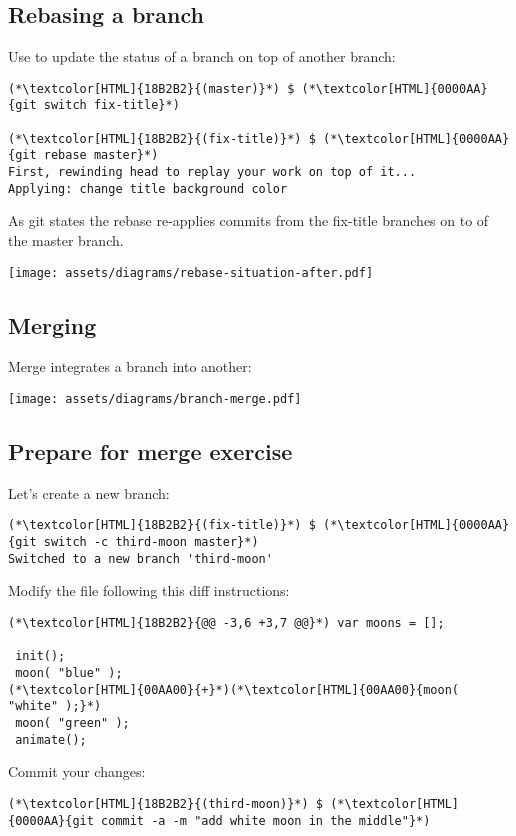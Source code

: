 \subsection{Rebasing a branch}
\begin{frame}[fragile]
  \subslidetitle

  Use  to update the status of a branch on top of another branch:

  \begin{lstlisting}
(*\textcolor[HTML]{18B2B2}{(master)}*) $ (*\textcolor[HTML]{0000AA}{git switch fix-title}*)

(*\textcolor[HTML]{18B2B2}{(fix-title)}*) $ (*\textcolor[HTML]{0000AA}{git rebase master}*)
First, rewinding head to replay your work on top of it...
Applying: change title background color
\end{lstlisting}

  As git states the rebase re-applies commits from the fix-title branches on to of the master branch.

  \vspace{1em}
  \centerline{\texttt{[image: assets/diagrams/rebase-situation-after.pdf]}}

\end{frame}

\subsection{Merging}
\begin{frame}[fragile]
  \subslidetitle
  Merge integrates a branch into another:
  \centerline{\texttt{[image: assets/diagrams/branch-merge.pdf]}}
\end{frame}

\subsection{Prepare for merge exercise}
\begin{frame}[fragile]
  \subslidetitle

  Let's create a new  branch:
  \begin{lstlisting}
(*\textcolor[HTML]{18B2B2}{(fix-title)}*) $ (*\textcolor[HTML]{0000AA}{git switch -c third-moon master}*)
Switched to a new branch 'third-moon'
\end{lstlisting}

  Modify the  file following this diff instructions:
  \begin{lstlisting}
(*\textcolor[HTML]{18B2B2}{@@ -3,6 +3,7 @@}*) var moons = [];

 init();
 moon( "blue" );
(*\textcolor[HTML]{00AA00}{+}*)(*\textcolor[HTML]{00AA00}{moon( "white" );}*)
 moon( "green" );
 animate();
\end{lstlisting}
  Commit your changes:
  \begin{lstlisting}
(*\textcolor[HTML]{18B2B2}{(third-moon)}*) $ (*\textcolor[HTML]{0000AA}{git commit -a -m "add white moon in the middle"}*)
\end{lstlisting}
\end{frame}

